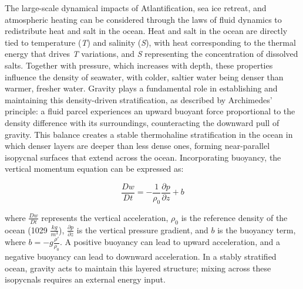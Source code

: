 \documentclass[draft]{agujournal2019}
\begin{document}



The large-scale dynamical impacts of Atlantification, sea ice retreat, and atmospheric heating can be considered through the laws of fluid dynamics to redistribute heat and salt in the ocean. Heat and salt in the ocean are directly tied to temperature (\emph{T}) and salinity (\emph{S}), with heat corresponding to the thermal energy that drives \emph{T} variations, and \emph{S} representing the concentration of dissolved salts. Together with pressure, which increases with depth, these properties influence the density of seawater, with colder, saltier water being denser than warmer, fresher water. Gravity plays a fundamental role in establishing and maintaining this density-driven stratification, as described by Archimedes' principle: a fluid parcel experiences an upward buoyant force proportional to the density difference with its surroundings, counteracting the downward pull of gravity. This balance creates a stable thermohaline stratification in the ocean in which denser layers are deeper than less dense ones, forming near-parallel isopycnal surfaces that extend across the ocean. Incorporating buoyancy, the vertical momentum equation can be expressed as:

$$
\frac{Dw}{Dt} = -\frac{1}{\rho_0} \frac{\partial p}{\partial z} + b
$$

where $\frac{Dw}{Dt}$ represents the vertical acceleration, ${\rho_0}$ is the reference density of the ocean (1029 $\frac{kg}{m^3}$), $\frac{\partial p}{\partial z}$ is the vertical pressure gradient, and $b$ is the buoyancy term, where $b = -g \frac{\rho'}{\rho_0}$. A positive buoyancy can lead to upward acceleration, and a negative buoyancy can lead to downward acceleration. In a stably stratified ocean, gravity acts to maintain this layered structure; mixing across these isopycnals requires an external energy input.
\end{document}
